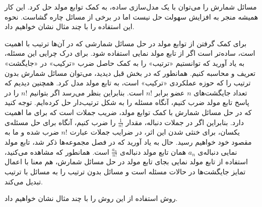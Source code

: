 مسائل شمارش را می‌توان با یک مدل‌سازی ساده، به کمک توابع مولد حل کرد.
این کار همیشه منجر به افزایش سهولت حل نیست اما در برخی از مسائل چاره گشاست.
نحوه این استفاده را با چند مثال نشان خواهیم داد.






برای کمک گرفتن از توابع مولد در حل مسائل شمارشی که در آن‌ها ترتیب با اهمیت است،
ساده‌تر است اگر از تابع مولد نمایی استفاده شود.
برای درک چرایی این مسئله، به یاد آورید که توانستیم
«ترتیب»
را به کمک حاصل ضرب
«ترکیب»
در
«جایگشت»
تعریف و محاسبه کنیم.
همانطور که در بخش قبل دیدید، می‌توان مسائل شمارش بدون ترتیب
را که حوزه عملکردی
«ترکیب»
است، به تابع مولد مدل کرد.
همچنین دیدیم که
تعداد جایگشت‌های
$n$ عضو
برابر $n!$
است.
بنابراین بنظر می‌رسد اگر بتوانیم
$n!$
را در پاسخ تابع مولد ضرب کنیم، آنگاه مسئله را به شکل ترتیب‌دار حل کرده‌ایم.
توجه کنید که در حل مسائل شمارش با کمک توابع مولد، ضریب جملات است که برای ما اهمیت دارد. بنابراین اگر در جملات
دنباله‌، مقدار
$\frac{1}{n!}$
را ضرب کنیم، آنگاه برای حل مسئله‌ی یکسان، برای خنثی شدن این اثر، در ضرایب جملات عبارت
$n!$
ضرب شده و ما به مقصود خود خواهیم رسید.
حال به یاد آورید که در فصل مجموعه‌ها ذکر شد، تابع مولد نمایی دنباله‌ی
$a_n$
همان تابع مولد دنباله‌ی
$\frac{a_n}{n!}$
است.
همانطور که مشاهده می‌کنید، استفاده از تابع مولد نمایی بجای تابع مولد در حل مسائل شمارش، هم معنا با اعمال تمایز
جایگشت‌ها در حالات مسئله است و مسائل بدون ترتیب را به مسائل با ترتیب تبدیل می‌کند.

روش استفاده از این روش را با چند مثال نشان خواهیم داد.



